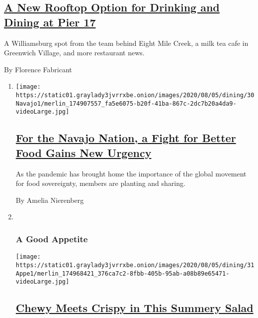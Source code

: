 \begin{enumerate}
{  \subsection{\texorpdfstring{\href{/2020/08/04/dining/nyc-restaurant-news.html}{A
  New Rooftop Option for Drinking and Dining at Pier
  17}}{A New Rooftop Option for Drinking and Dining at Pier 17}}\label{a-new-rooftop-option-for-drinking-and-dining-at-pier-17}}

  A Williamsburg spot from the team behind Eight Mile Creek, a milk tea
  cafe in Greenwich Village, and more restaurant news.

  By Florence Fabricant
\end{enumerate}

\begin{enumerate}
\def\labelenumi{\arabic{enumi}.}
\item
  \texttt{[image: https://static01.graylady3jvrrxbe.onion/images/2020/08/05/dining/30Navajo1/merlin\_174907557\_fa5e6075-b20f-41ba-867c-2dc7b20a4da9-videoLarge.jpg]}

  \hypertarget{for-the-navajo-nation-a-fight-for-better-food-gains-new-urgency}{%
  \subsection{\texorpdfstring{\href{/2020/08/03/dining/navajo-nation-food-coronavirus.html}{For
  the Navajo Nation, a Fight for Better Food Gains New
  Urgency}}{For the Navajo Nation, a Fight for Better Food Gains New Urgency}}\label{for-the-navajo-nation-a-fight-for-better-food-gains-new-urgency}}

  As the pandemic has brought home the importance of the global movement
  for food sovereignty, members are planting and sharing.

  By Amelia Nierenberg
\item ~
  \hypertarget{a-good-appetite-1}{%
  \subsubsection{A Good Appetite}\label{a-good-appetite-1}}

  \texttt{[image: https://static01.graylady3jvrrxbe.onion/images/2020/08/05/dining/31Appe1/merlin\_174968421\_376ca7c2-8fbb-405b-95ab-a08b89e65471-videoLarge.jpg]}

  \hypertarget{chewy-meets-crispy-in-this-summery-salad}{%
  \subsection{\texorpdfstring{\href{/2020/07/31/dining/farro-corn-chickpea-salad-recipe.html}{Chewy
  Meets Crispy in This Summery
  Salad}}{Chewy Meets Crispy in This Summery Salad}}\label{chewy-meets-crispy-in-this-summery-salad}}


\end{enumerate}
